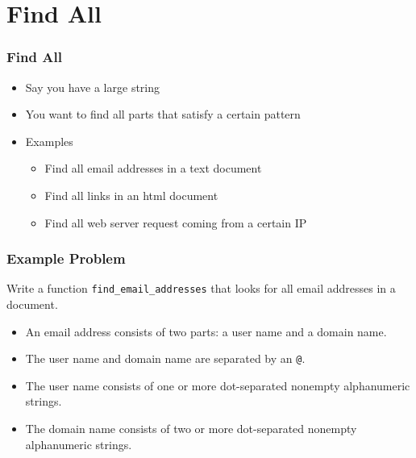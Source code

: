 \section{Find All}

\frame{\tableofcontents[currentsection]}

\begin{frame}
  \frametitle{Find All}
  \begin{itemize}
    \item Say you have a large string
    \item You want to find all parts that satisfy a certain pattern
    \item Examples
      \begin{itemize}
        \item Find all email addresses in a text document
        \item Find all links in an html document
        \item Find all web server request coming from a certain IP
      \end{itemize}
  \end{itemize}
\end{frame}

\begin{frame}
  \frametitle{Example Problem}
  \begin{center}
    Write a function \texttt{find\_email\_addresses} that looks for all email addresses in a document.
  \end{center}
  \vskip5mm
  \begin{itemize}
    \item An email address consists of two parts: a user name and a domain name.
    \item The user name and domain name are separated by an \texttt{@}.
    \item The user name consists of one or more dot-separated nonempty alphanumeric strings.
    \item The domain name consists of two or more dot-separated nonempty alphanumeric strings.
  \end{itemize}
\end{frame}

